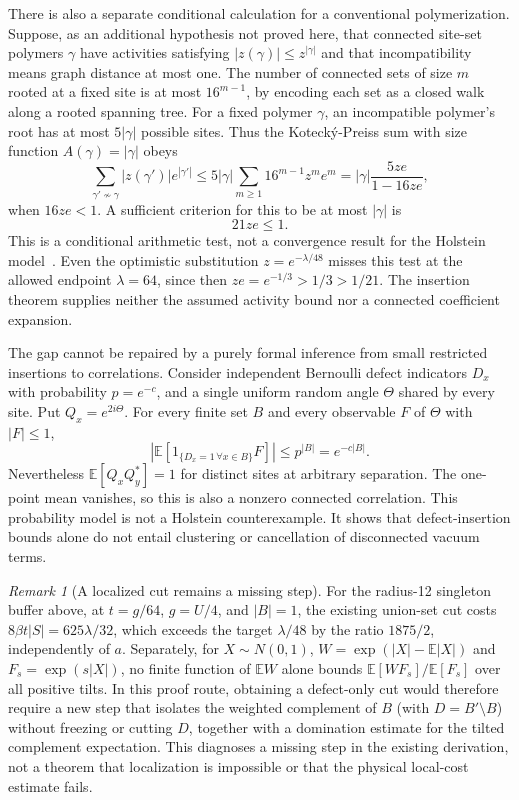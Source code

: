 \documentclass[11pt]{article}
\theoremstyle{remark}
\newtheorem{remark}{Remark}
\begin{document}
There is also a separate conditional calculation for a conventional polymerization. Suppose, as an additional hypothesis not proved here, that connected site-set polymers $\gamma$ have activities satisfying $|z(\gamma)|\le z^{|\gamma|}$ and that incompatibility means graph distance at most one. The number of connected sets of size $m$ rooted at a fixed site is at most $16^{m-1}$, by encoding each set as a closed walk along a rooted spanning tree. For a fixed polymer $\gamma$, an incompatible polymer's root has at most $5|\gamma|$ possible sites. Thus the Koteck\'y-Preiss sum with size function $A(\gamma)=|\gamma|$ obeys
\[
 \sum_{\gamma'\not\sim\gamma}|z(\gamma')|e^{|\gamma'|}
 \le5|\gamma|\sum_{m\ge1}16^{m-1}z^m e^m
 =|\gamma|\frac{5ze}{1-16ze},
\]
when $16ze<1$. A sufficient criterion for this to be at most $|\gamma|$ is
\[
 21ze\le1.
\]
This is a conditional arithmetic test, not a convergence result for the Holstein model~\cite{kp}. Even the optimistic substitution $z=e^{-\lambda/48}$ misses this test at the allowed endpoint $\lambda=64$, since then $ze=e^{-1/3}>1/3>1/21$. The insertion theorem supplies neither the assumed activity bound nor a connected coefficient expansion.

The gap cannot be repaired by a purely formal inference from small restricted insertions to correlations. Consider independent Bernoulli defect indicators $D_x$ with probability $p=e^{-c}$, and a single uniform random angle $\Theta$ shared by every site. Put $Q_x=e^{2i\Theta}$. For every finite set $B$ and every observable $F$ of $\Theta$ with $|F|\le1$,
\[
 \left|\mathbb E\left[1_{\{D_x=1\,\forall x\in B\}}F\right]\right|
 \le p^{|B|}=e^{-c|B|}.
\]
Nevertheless $\mathbb E[Q_xQ_y^*]=1$ for distinct sites at arbitrary separation. The one-point mean vanishes, so this is also a nonzero connected correlation. This probability model is not a Holstein counterexample. It shows that defect-insertion bounds alone do not entail clustering or cancellation of disconnected vacuum terms.

\begin{remark}[A localized cut remains a missing step]
For the radius-12 singleton buffer above, at $t=g/64$, $g=U/4$, and $|B|=1$, the existing union-set cut costs $8\beta t|S|=625\lambda/32$, which exceeds the target $\lambda/48$ by the ratio $1875/2$, independently of $a$. Separately, for $X\sim N(0,1)$, $W=\exp(|X|-\mathbb E|X|)$ and $F_s=\exp(s|X|)$, no finite function of $\mathbb E W$ alone bounds $\mathbb E[WF_s]/\mathbb E[F_s]$ over all positive tilts. In this proof route, obtaining a defect-only cut would therefore require a new step that isolates the weighted complement of $B$ (with $D=B'\setminus B$) without freezing or cutting $D$, together with a domination estimate for the tilted complement expectation. This diagnoses a missing step in the existing derivation, not a theorem that localization is impossible or that the physical local-cost estimate fails.
\end{remark}
\end{document}
